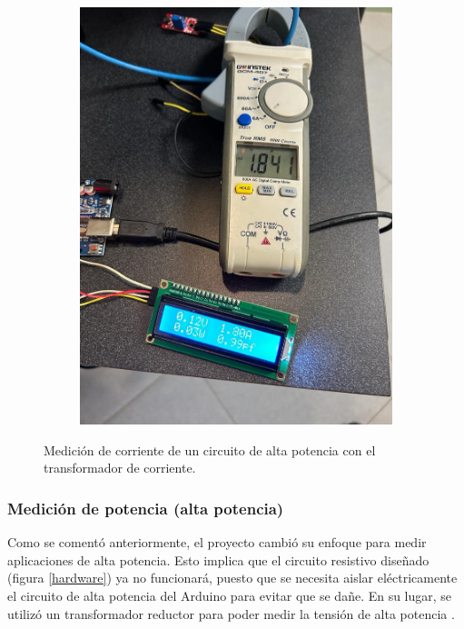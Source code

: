 \begin{figure}
\begin{subfigure}{0.45\textwidth}
        \includegraphics[width=\textwidth]{Imagenes/corriente2.jpeg}
    \end{subfigure}
    \caption{Medición de corriente de un circuito de alta potencia con el transformador de corriente.}
    \label{current-res}
\end{figure}

\subsubsection{Medición de potencia (alta potencia)}
Como se comentó anteriormente, el proyecto cambió su enfoque para medir aplicaciones de alta potencia. Esto implica que el circuito resistivo diseñado (figura \ref{hardware}) ya no funcionará, puesto que se necesita aislar eléctricamente el circuito de alta potencia del Arduino para evitar que se dañe. En su lugar, se utilizó un transformador reductor para poder medir la tensión de alta potencia \cite{hayt}.

